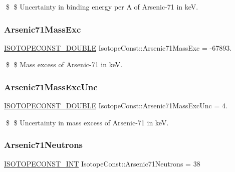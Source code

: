 \$ \$ Uncertainty in binding energy per A of Arsenic-\/71 in keV. \mbox{\label{group___isotope_const-_arsenic-_as71_gac778bc53519616e5996cb556ed36c9f3}} 
\subsubsection{\texorpdfstring{Arsenic71\+Mass\+Exc}{Arsenic71MassExc}}
{\footnotesize\ttfamily \mbox{\hyperlink{group___isotope_const-_macros_ga8f45a7272ce02c0b4c65c44636ed719a}{I\+S\+O\+T\+O\+P\+E\+C\+O\+N\+S\+T\+\_\+\+D\+O\+U\+B\+LE}} Isotope\+Const\+::\+Arsenic71\+Mass\+Exc = -\/67893.}

\$ \$ Mass excess of Arsenic-\/71 in keV. \mbox{\label{group___isotope_const-_arsenic-_as71_ga67fb0706ca70c734a051638e24e739a4}} 
\subsubsection{\texorpdfstring{Arsenic71\+Mass\+Exc\+Unc}{Arsenic71MassExcUnc}}
{\footnotesize\ttfamily \mbox{\hyperlink{group___isotope_const-_macros_ga8f45a7272ce02c0b4c65c44636ed719a}{I\+S\+O\+T\+O\+P\+E\+C\+O\+N\+S\+T\+\_\+\+D\+O\+U\+B\+LE}} Isotope\+Const\+::\+Arsenic71\+Mass\+Exc\+Unc = 4.}

\$ \$ Uncertainty in mass excess of Arsenic-\/71 in keV. \mbox{\label{group___isotope_const-_arsenic-_as71_gad7758f988b132cb80d0824753cfe0b02}} 
\subsubsection{\texorpdfstring{Arsenic71\+Neutrons}{Arsenic71Neutrons}}
{\footnotesize\ttfamily \mbox{\hyperlink{group___isotope_const-_macros_ga5f18360b3e99483a35c32d789e62621c}{I\+S\+O\+T\+O\+P\+E\+C\+O\+N\+S\+T\+\_\+\+I\+NT}} Isotope\+Const\+::\+Arsenic71\+Neutrons = 38}

